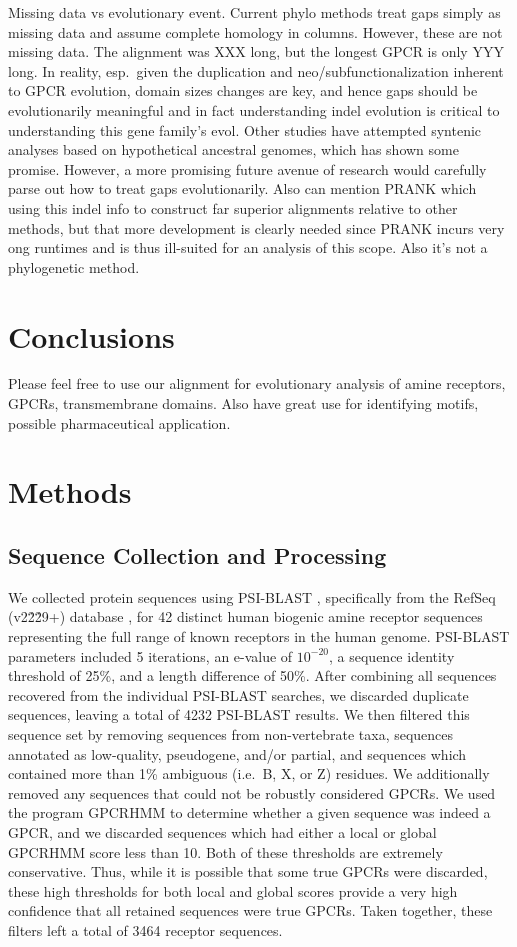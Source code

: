 \documentclass[fleqn,10pt]{wlpeerj}
\begin{document}
Missing data vs evolutionary event. Current phylo methods treat gaps simply as missing data and assume complete homology in columns. However, these are not missing data. The alignment was XXX long, but the longest GPCR is only YYY long. In reality, esp.\ given the duplication and neo/subfunctionalization inherent to GPCR evolution, domain sizes changes are key, and hence gaps should be evolutionarily meaningful and in fact understanding indel evolution is critical to understanding this gene family's evol. Other studies have attempted syntenic analyses based on hypothetical ancestral genomes, which has shown some promise. However, a more promising future avenue of research would carefully parse out how to treat gaps evolutionarily. Also can mention PRANK which using this indel info to construct far superior alignments relative to other methods, but that more development is clearly needed since PRANK incurs very ong runtimes and is thus ill-suited for an analysis of this scope. Also it's not a phylogenetic method.

\section*{Conclusions}
Please feel free to use our alignment for evolutionary analysis of amine receptors, GPCRs, transmembrane domains. Also have great use for identifying motifs, possible pharmaceutical application.



\section*{Methods}

\subsection*{Sequence Collection and Processing}
We collected protein sequences using PSI-BLAST \citep{psiblast}, specifically from the RefSeq (v2\.2\.29+) database \citep{refseq}, for 42 distinct human biogenic amine receptor sequences representing the full range of known receptors in the human genome. PSI-BLAST parameters included 5 iterations, an e-value of $10^{-20}$, a sequence identity threshold of 25\%, and a length difference of 50\%. After combining all sequences recovered from the individual PSI-BLAST searches, we discarded duplicate sequences, leaving a total of 4232 PSI-BLAST results. We then filtered this sequence set by removing sequences from non-vertebrate taxa, sequences annotated as low-quality, pseudogene, and/or partial, and sequences which contained more than 1\% ambiguous (i.e.\ B, X, or Z) residues. We additionally removed any sequences that could not be robustly considered GPCRs. We used the program GPCRHMM \citep{Wistrand2006} to determine whether a given sequence was indeed a GPCR, and we discarded sequences which had either a local or global GPCRHMM score less than 10. Both of these thresholds are extremely conservative. Thus, while it is possible that some true GPCRs were discarded, these high thresholds for both local and global scores provide a very high confidence that all retained sequences were true GPCRs. Taken together, these filters left a total of 3464 receptor sequences.
\end{document}
